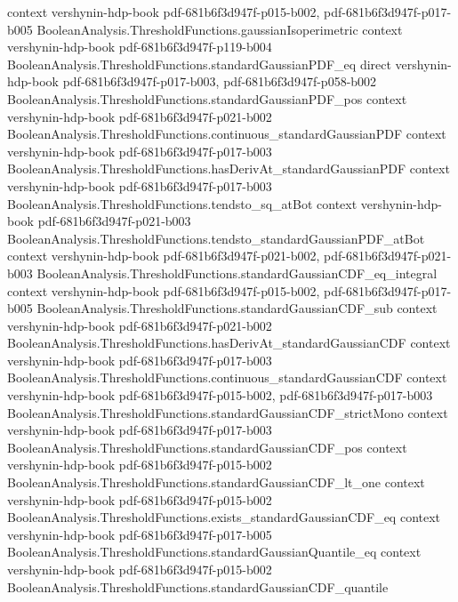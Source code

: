 \begin{theorem}
  {context}
  {vershynin-hdp-book}
  {pdf-681b6f3d947f-p015-b002,
    pdf-681b6f3d947f-p017-b005}
\proofstep
  {BooleanAnalysis.ThresholdFunctions.gaussianIsoperimetric}
  {context}
  {vershynin-hdp-book}
  {pdf-681b6f3d947f-p119-b004}
\proofstep
  {BooleanAnalysis.ThresholdFunctions.standardGaussianPDF_eq}
  {direct}
  {vershynin-hdp-book}
  {pdf-681b6f3d947f-p017-b003,
    pdf-681b6f3d947f-p058-b002}
\proofstep
  {BooleanAnalysis.ThresholdFunctions.standardGaussianPDF_pos}
  {context}
  {vershynin-hdp-book}
  {pdf-681b6f3d947f-p021-b002}
\proofstep
  {BooleanAnalysis.ThresholdFunctions.continuous_standardGaussianPDF}
  {context}
  {vershynin-hdp-book}
  {pdf-681b6f3d947f-p017-b003}
\proofstep
  {BooleanAnalysis.ThresholdFunctions.hasDerivAt_standardGaussianPDF}
  {context}
  {vershynin-hdp-book}
  {pdf-681b6f3d947f-p017-b003}
\proofstep
  {BooleanAnalysis.ThresholdFunctions.tendsto_sq_atBot}
  {context}
  {vershynin-hdp-book}
  {pdf-681b6f3d947f-p021-b003}
\proofstep
  {BooleanAnalysis.ThresholdFunctions.tendsto_standardGaussianPDF_atBot}
  {context}
  {vershynin-hdp-book}
  {pdf-681b6f3d947f-p021-b002,
    pdf-681b6f3d947f-p021-b003}
\proofstep
  {BooleanAnalysis.ThresholdFunctions.standardGaussianCDF_eq_integral}
  {context}
  {vershynin-hdp-book}
  {pdf-681b6f3d947f-p015-b002,
    pdf-681b6f3d947f-p017-b005}
\proofstep
  {BooleanAnalysis.ThresholdFunctions.standardGaussianCDF_sub}
  {context}
  {vershynin-hdp-book}
  {pdf-681b6f3d947f-p021-b002}
\proofstep
  {BooleanAnalysis.ThresholdFunctions.hasDerivAt_standardGaussianCDF}
  {context}
  {vershynin-hdp-book}
  {pdf-681b6f3d947f-p017-b003}
\proofstep
  {BooleanAnalysis.ThresholdFunctions.continuous_standardGaussianCDF}
  {context}
  {vershynin-hdp-book}
  {pdf-681b6f3d947f-p015-b002,
    pdf-681b6f3d947f-p017-b003}
\proofstep
  {BooleanAnalysis.ThresholdFunctions.standardGaussianCDF_strictMono}
  {context}
  {vershynin-hdp-book}
  {pdf-681b6f3d947f-p017-b003}
\proofstep
  {BooleanAnalysis.ThresholdFunctions.standardGaussianCDF_pos}
  {context}
  {vershynin-hdp-book}
  {pdf-681b6f3d947f-p015-b002}
\proofstep
  {BooleanAnalysis.ThresholdFunctions.standardGaussianCDF_lt_one}
  {context}
  {vershynin-hdp-book}
  {pdf-681b6f3d947f-p015-b002}
\proofstep
  {BooleanAnalysis.ThresholdFunctions.exists_standardGaussianCDF_eq}
  {context}
  {vershynin-hdp-book}
  {pdf-681b6f3d947f-p017-b005}
\proofstep
  {BooleanAnalysis.ThresholdFunctions.standardGaussianQuantile_eq}
  {context}
  {vershynin-hdp-book}
  {pdf-681b6f3d947f-p015-b002}
\proofstep
  {BooleanAnalysis.ThresholdFunctions.standardGaussianCDF_quantile}

\end{theorem}

